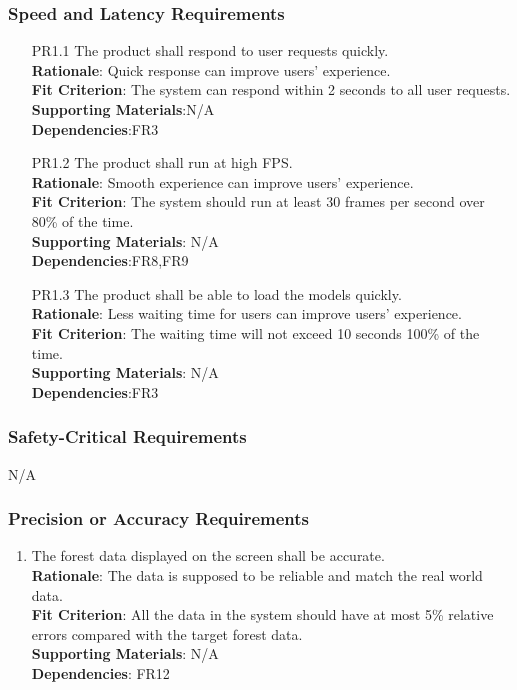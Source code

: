 \documentclass{article}
\begin{document}
\subsubsection{Speed and Latency Requirements}
\begin{enumerate}
    \item[PR1.1] The product shall respond to user requests quickly.\\
    \textbf{Rationale}: Quick response can improve users' experience.\\
    \textbf{Fit Criterion}: The system can respond within 2 seconds to all user requests.\\
\textbf{Supporting Materials}:N/A\\
\textbf{Dependencies}:FR3\\
    
    \item[PR1.2] The product shall run at high FPS.\\
    \textbf{Rationale}: Smooth experience can improve users' experience.\\
    \textbf{Fit Criterion}: The system should run at least 30 frames per second over 80\% of the time.\\
\textbf{Supporting Materials}: N/A\\
\textbf{Dependencies}:FR8,FR9\\
    
    \item[PR1.3] The product shall be able to load the models quickly.\\
    \textbf{Rationale}: Less waiting time for users can improve users' experience.\\
    \textbf{Fit Criterion}: The waiting time will not exceed 10 seconds 100\% of the time.\\
\textbf{Supporting Materials}: N/A\\
\textbf{Dependencies}:FR3\\

\end{enumerate}
\subsubsection{Safety-Critical Requirements}
N/A
\subsubsection{Precision or Accuracy Requirements}
\begin{enumerate}[PR3.1]
    \item The forest data displayed on the screen shall be accurate.\\
    \textbf{Rationale}: The data is supposed to be reliable and match the real world data.\\
    \textbf{Fit Criterion}: All the data in the system should have at most 5\% relative errors compared with the target
    forest data.\\
\textbf{Supporting Materials}: N/A\\
\textbf{Dependencies}: FR12\\
 

\end{enumerate}
\end{document}
